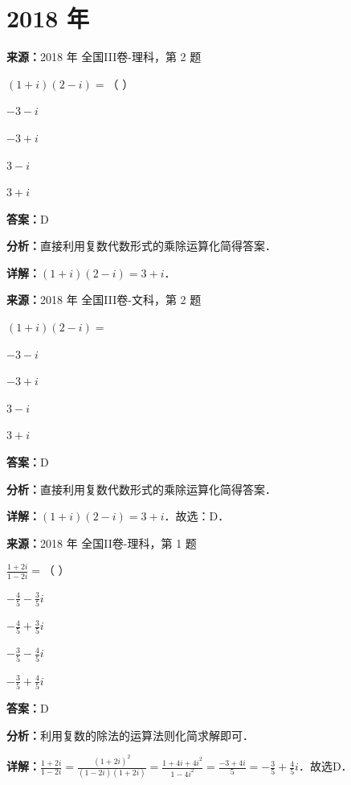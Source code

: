\section*{2018 年}

\begin{question}[points=5]
\textbf{来源：}2018 年 全国III卷-理科，第 2 题\par
$(1+i)(2-i)=$（ ）
\begin{choices}
  \item $-3-i$
  \item $-3+i$
  \item $3-i$
  \item $3+i$
\end{choices}
\begin{solution}
\textbf{答案：}D

\textbf{分析：}直接利用复数代数形式的乘除运算化简得答案．

\textbf{详解：}$(1+i)(2-i)=3+i$．
\end{solution}
\end{question}

\begin{question}[points=5]
\textbf{来源：}2018 年 全国III卷-文科，第 2 题\par
$(1+i)(2-i)=$
\begin{choices}
  \item $-3-i$
  \item $-3+i$
  \item $3-i$
  \item $3+i$
\end{choices}
\begin{solution}
\textbf{答案：}D

\textbf{分析：}直接利用复数代数形式的乘除运算化简得答案．

\textbf{详解：}$(1+i)(2-i)=3+i$．故选：D．
\end{solution}
\end{question}

\begin{question}[points=5]
\textbf{来源：}2018 年 全国II卷-理科，第 1 题\par
$\frac{1+2i}{1-2i}=$（    ）
\begin{choices}
  \item $-\frac{4}{5}-\frac{3}{5}i$
  \item $-\frac{4}{5}+\frac{3}{5}i$
  \item $-\frac{3}{5}-\frac{4}{5}i$
  \item $-\frac{3}{5}+\frac{4}{5}i$
\end{choices}
\begin{solution}
\textbf{答案：}D

\textbf{分析：}利用复数的除法的运算法则化简求解即可．

\textbf{详解：}$\frac{1+2i}{1-2i}=\frac{(1+2i)^2}{(1-2i)(1+2i)}=\frac{1+4i+4i^2}{1-4i^2}=\frac{-3+4i}{5}=-\frac{3}{5}+\frac{4}{5}i$．故选D．
\end{solution}
\end{question}

